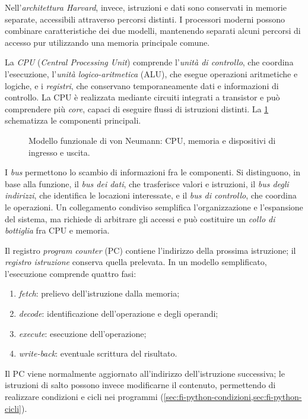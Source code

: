 Nell'\emph{architettura Harvard}, invece, istruzioni e dati
sono conservati in memorie separate, accessibili attraverso
percorsi distinti. I processori moderni possono combinare
caratteristiche dei due modelli, mantenendo separati alcuni
percorsi di accesso pur utilizzando una memoria principale comune.

La \emph{CPU} (\emph{Central Processing Unit}) comprende l'\emph{unità
di controllo}, che coordina l'esecuzione, l'\emph{unità
logico-aritmetica} (ALU), che esegue operazioni aritmetiche e logiche,
e i \emph{registri}, che conservano temporaneamente dati e informazioni
di controllo. La CPU è realizzata mediante circuiti integrati a transistor
e può comprendere più \emph{core}, capaci di eseguire flussi di
istruzioni distinti. La \cref{fig:fi-von-neumann} schematizza
le componenti principali.

\begin{figure}[htbp]
  \centering
  
  \caption{Modello funzionale di von Neumann: CPU, memoria e
  dispositivi di ingresso e uscita.}
  \label{fig:fi-von-neumann}
\end{figure}

I \emph{bus} permettono lo scambio di informazioni fra le componenti.
Si distinguono, in base alla funzione, il \emph{bus dei dati}, che
trasferisce valori e istruzioni, il \emph{bus degli indirizzi}, che
identifica le locazioni interessate, e il \emph{bus di controllo},
che coordina le operazioni. Un collegamento condiviso semplifica
l'organizzazione e l'espansione del sistema, ma richiede di arbitrare
gli accessi e può costituire un \emph{collo di bottiglia} fra CPU e memoria.

\clearpage

Il registro \emph{program counter} (PC) contiene l'indirizzo della
prossima istruzione; il \emph{registro istruzione} conserva quella
prelevata. In un modello semplificato, l'esecuzione comprende quattro fasi:
\begin{enumerate}
  \item \emph{fetch}: prelievo dell'istruzione dalla memoria;
  \item \emph{decode}: identificazione dell'operazione e degli operandi;
  \item \emph{execute}: esecuzione dell'operazione;
  \item \emph{write-back}: eventuale scrittura del risultato.
\end{enumerate}
Il PC viene normalmente aggiornato all'indirizzo dell'istruzione
successiva; le istruzioni di salto possono invece modificarne il
contenuto, permettendo di realizzare condizioni e cicli nei programmi
(\cref{sec:fi-python-condizioni,sec:fi-python-cicli}).

